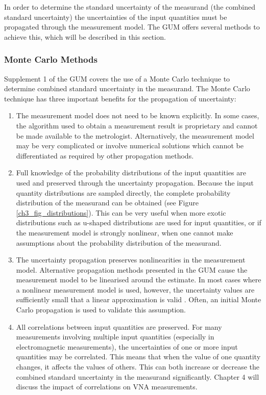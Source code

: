 \documentclass[../thesis/thesis.tex]{subfiles}
\begin{document}
In order to determine the standard uncertainty of the measurand (the combined standard uncertainty) the uncertainties of the input quantities must be propagated through the measurement model. The GUM offers several methods to achieve this, which will be described in this section.

\subsubsection{Monte Carlo Methods}

Supplement 1 of the GUM \cite{GUM_S1} covers the use of a Monte Carlo technique to determine combined standard uncertainty in the measurand. The Monte Carlo technique has three important benefits for the propagation of uncertainty:

\begin{enumerate}
	\item The measurement model does not need to be known explicitly. In some cases, the algorithm used to obtain a measurement result is proprietary and cannot be made available to the metrologist. Alternatively, the measurement model may be very complicated or involve numerical solutions which cannot be differentiated as required by other propagation methods.
	\item Full knowledge of the probability distributions of the input quantities are used and preserved through the uncertainty propagation. Because the input quantity distributions are sampled directly, the complete probability distribution of the measurand can be obtained (see Figure \ref{ch3_fig_distributions}). This can be very useful when more exotic distributions such as u-shaped distributions are used for input quantities, or if the measurement model is strongly nonlinear, when one cannot make assumptions about the probability distribution of the measurand.
	\item The uncertainty propagation preserves nonlinearities in the measurement model. Alternative propagation methods presented in the GUM cause the measurement model to be linearised around the estimate. In most cases where a nonlinear measurement model is used, however, the uncertainty values are sufficiently small that a linear approximation is valid \cite[5.1.5]{GUM_2008}. Often, an initial Monte Carlo propagation is used to validate this assumption.
	\item All correlations between input quantities are preserved. For many measurements involving multiple input quantities (especially in electromagnetic measurements), the uncertainties of one or more input quantities may be correlated. This means that when the value of one quantity changes, it affects the values of others. This can both increase or decrease the combined standard uncertainty in the measurand significantly. Chapter 4 will discuss the impact of correlations on VNA measurements.
\end{enumerate}
\end{document}
